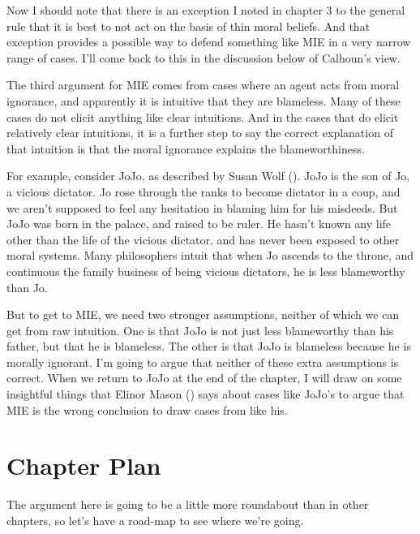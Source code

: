 \documentclass[
  10pt,
  letterpaper,
  twoside]{scrbook}
\begin{document}
Now I should note that there is an exception I noted in chapter 3 to the
general rule that it is best to not act on the basis of thin moral
beliefs. And that exception provides a possible way to defend something
like MIE in a very narrow range of cases. I'll come back to this in the
discussion below of Calhoun's view.

The third argument for MIE comes from cases where an agent acts from
moral ignorance, and apparently it is intuitive that they are blameless.
Many of these cases do not elicit anything like clear intuitions. And in
the cases that do elicit relatively clear intuitions, it is a further
step to say the correct explanation of that intuition is that the moral
ignorance explains the blameworthiness.

For example, consider {JoJo}, as described by Susan Wolf
(). {JoJo} is the son of Jo, a vicious
dictator. Jo rose through the ranks to become dictator in a coup, and we
aren't supposed to feel any hesitation in blaming him for his misdeeds.
But {JoJo} was born in the palace, and raised to be ruler. He hasn't
known any life other than the life of the vicious dictator, and has
never been exposed to other moral systems. Many philosophers intuit that
when Jo ascends to the throne, and continuous the family business of
being vicious dictators, he is less blameworthy than Jo.

But to get to MIE, we need two stronger assumptions, neither of which we
can get from raw intuition. One is that {JoJo} is not just less
blameworthy than his father, but that he is blameless. The other is that
{JoJo} is blameless because he is morally ignorant. I'm going to argue
that neither of these extra assumptions is correct. When we return to
{JoJo} at the end of the chapter, I will draw on some insightful things
that Elinor Mason () says about cases like
{JoJo}'s to argue that MIE is the wrong conclusion to draw cases from
like his.

\section{Chapter Plan}\label{chapterplan}

The argument here is going to be a little more roundabout than in other
chapters, so let's have a road-map to see where we're going.
\end{document}
